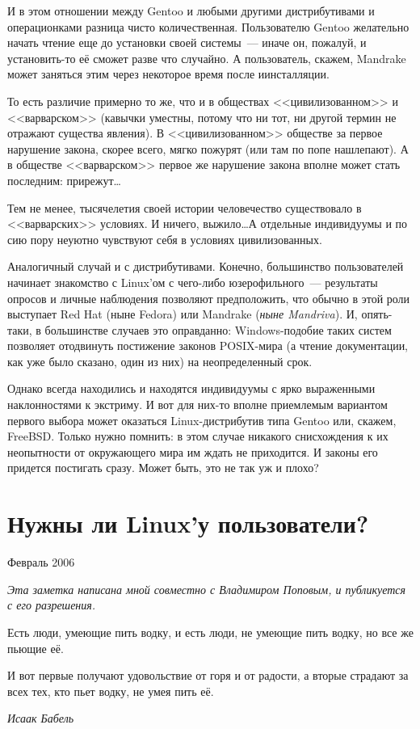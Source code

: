 И в этом отношении между Gentoo и любыми другими дистрибутивами и операционками разница чисто количественная. Пользователю Gentoo желательно начать чтение еще до установки своей системы~--- иначе он, пожалуй, и установить-то её сможет разве что случайно. А пользователь, скажем, Mandrake может заняться этим через некоторое время после иинсталляции.

То есть различие примерно то же, что и в обществах <<цивилизованном>> и <<варварском>> (кавычки уместны, потому что ни тот, ни другой термин не отражают существа явления). В <<цивилизованном>> обществе за первое нарушение закона, скорее всего, мягко пожурят (или там по попе нашлепают). А в обществе <<варварском>> первое же нарушение закона вполне может стать последним: прирежут\dots

Тем не менее, тысячелетия своей истории человечество существовало в <<варварских>> условиях. И ничего, выжило\dots А отдельные индивидуумы и по сию пору неуютно чувствуют себя в условиях цивилизованных.

Аналогичный случай и с дистрибутивами. Конечно, большинство пользователей начинает знакомство с Linux'ом с чего-либо юзерофильного~--- результаты опросов и личные наблюдения позволяют предположить, что обычно в этой роли выступает Red Hat (ныне Fedora) или Mandrake (\textit{ныне Mandriva}). И, опять-таки, в большинстве случаев это оправданно: Windows-подобие таких систем позволяет отодвинуть постижение законов POSIX-мира (а чтение документации, как уже было сказано, один из них) на неопределенный срок.

Однако всегда находились и находятся индивидуумы с ярко выраженными наклонностями к экстриму. И вот для них-то вполне приемлемым вариантом первого выбора может оказаться Linux-дистрибутив типа Gentoo или, скажем, FreeBSD. Только нужно помнить: в этом случае никакого снисхождения к их неопытности от окружающего мира им ждать не приходится. И законы его придется постигать сразу. Может быть, это не так уж и плохо?

\section{Нужны ли Linux'у пользователи?} 
\begin{timeline}
Февраль 2006
\end{timeline}

\textsl{Эта заметка написана мной совместно с Владимиром Поповым, и публикуется с его разрешения.}

\hfill \begin{minipage}[h]{0.45\textwidth}
Есть люди, умеющие пить водку, и есть люди, не умеющие пить водку, но все же пьющие её.

И вот первые получают удовольствие от горя и от радости, а вторые страдают за всех тех, кто пьет водку, не умея пить её.
\begin{flushright}
\textit{Исаак Бабель}
\end{flushright}
\bigskip\end{minipage} 

